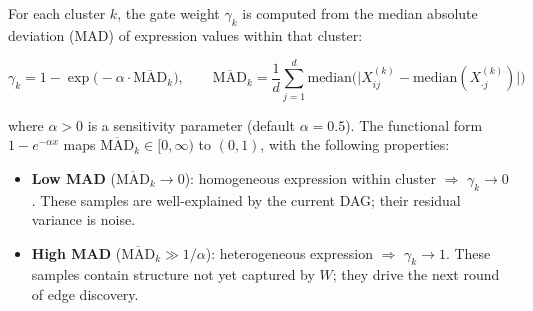 \documentclass[12pt,a4paper]{article}
\begin{document}
For each cluster $k$, the gate weight $\gamma_k$ is computed from the median absolute deviation (MAD) of expression values within that cluster:









\begin{equation}\label{eq:gate}




\gamma_k = 1 - \exp\!\big(-\alpha \cdot \overline{\text{MAD}}_k\big), \qquad




\overline{\text{MAD}}_k = \frac{1}{d}\sum_{j=1}^{d} \text{median}\Big(\big|X_{ij}^{(k)} - \text{median}(X_{\cdot j}^{(k)})\big|\Big)




\end{equation}









where $\alpha > 0$ is a sensitivity parameter (default $\alpha = 0.5$). The functional form $1 - e^{-\alpha x}$ maps $\overline{\text{MAD}}_k \in [0, \infty)$ to $(0,1)$, with the following properties:









\begin{itemize}[leftmargin=*,itemsep=2pt]




    \item \textbf{Low MAD} ($\overline{\text{MAD}}_k \to 0$): homogeneous expression within cluster $\Rightarrow$ $\gamma_k \to 0$. These samples are well-explained by the current DAG; their residual variance is noise.




    \item \textbf{High MAD} ($\overline{\text{MAD}}_k \gg 1/\alpha$): heterogeneous expression $\Rightarrow$ $\gamma_k \to 1$. These samples contain structure not yet captured by $W$; they drive the next round of edge discovery.




\end{itemize}
\end{document}
